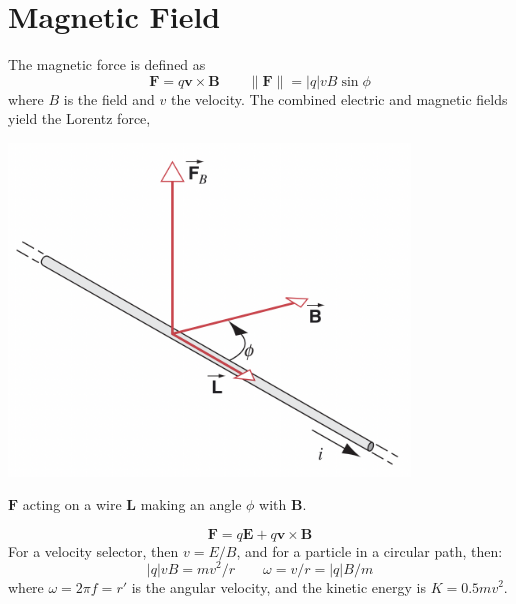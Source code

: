 \documentclass{tufte-book}
\renewcommand{\b}{\mathbf}
\begin{document}
\section{Magnetic Field}
The magnetic force is defined as \begin{equation}
    \b F = q \b v \times \b B \qquad \| \b F \| = |q| v B \sin \phi
\end{equation}
where $B$ is the field and $v$ the velocity. The combined electric and magnetic fields yield the Lorentz force,
%
\begin{marginfigure}
  \includegraphics[width=0.8\textwidth]{wire}
  \caption{$\b F$ acting on a wire $\b L$ making an angle $\phi$ with $\b B$.}
\end{marginfigure}
%
\begin{equation}
    \b F = q \b E + q \b v \times \b B
\end{equation}
For a velocity selector, then $v = E/B$, and for a particle in a circular path, then: \begin{equation}
    |q|v B = mv^2/r \qquad \omega = v/r = |q|B/m
\end{equation}
where $\omega = 2 \pi f = r'$ is the angular velocity, and the kinetic energy is $K = 0.5 mv^2$.
\end{document}
